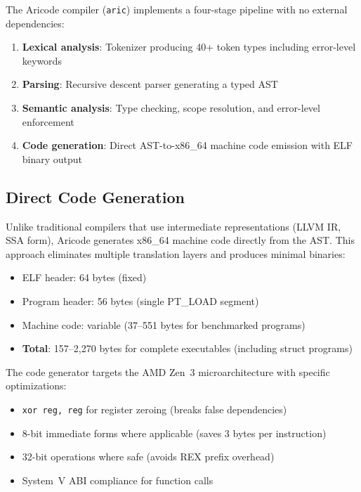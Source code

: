 \documentclass[11pt,a4paper]{article}
\begin{document}
The Aricode compiler (\texttt{aric}) implements a four-stage pipeline with no external dependencies:

\begin{enumerate}
    \item \textbf{Lexical analysis}: Tokenizer producing 40+ token types including error-level keywords
    \item \textbf{Parsing}: Recursive descent parser generating a typed AST
    \item \textbf{Semantic analysis}: Type checking, scope resolution, and error-level enforcement
    \item \textbf{Code generation}: Direct AST-to-x86\_64 machine code emission with ELF binary output
\end{enumerate}

\subsection{Direct Code Generation}

Unlike traditional compilers that use intermediate representations (LLVM IR, SSA form), Aricode generates x86\_64 machine code directly from the AST. This approach eliminates multiple translation layers and produces minimal binaries:

\begin{itemize}
    \item ELF header: 64 bytes (fixed)
    \item Program header: 56 bytes (single PT\_LOAD segment)
    \item Machine code: variable (37--551 bytes for benchmarked programs)
    \item \textbf{Total}: 157--2{,}270 bytes for complete executables (including struct programs)
\end{itemize}

The code generator targets the AMD Zen~3 microarchitecture with specific optimizations:
\begin{itemize}
    \item \texttt{xor reg, reg} for register zeroing (breaks false dependencies)
    \item 8-bit immediate forms where applicable (saves 3 bytes per instruction)
    \item 32-bit operations where safe (avoids REX prefix overhead)
    \item System~V ABI compliance for function calls
\end{itemize}
\end{document}
